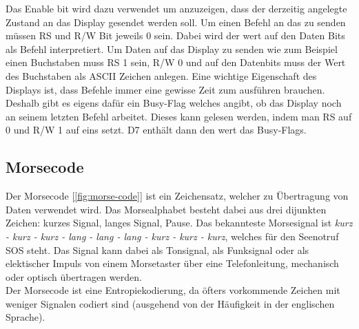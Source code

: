\documentclass[a4paper,12pt]{article}
\begin{document}
	Das Enable bit wird dazu verwendet um anzuzeigen, dass der derzeitig angelegte Zustand an das Display gesendet werden soll. Um einen Befehl an das zu senden müssen RS und R/W Bit jeweils 0 sein. Dabei wird der wert auf den Daten Bits als Befehl interpretiert. Um Daten auf das Display zu senden wie zum Beispiel einen Buchstaben muss RS 1 sein, R/W 0 und auf den Datenbits muss der Wert des Buchstaben als ASCII Zeichen anlegen. Eine wichtige Eigenschaft des Displays ist, dass Befehle immer eine gewisse Zeit zum ausführen brauchen. Deshalb gibt es eigens dafür ein Busy-Flag welches angibt, ob das Display noch an seinem letzten Befehl arbeitet. Dieses kann gelesen werden, indem man RS auf 0 und R/W 1 auf eins setzt. D7 enthält dann den wert das Busy-Flags.

	\subsection{Morsecode}
	Der Morsecode [\ref{fig:morse-code}] ist ein Zeichensatz, welcher zu Übertragung von Daten verwendet wird. Das Morsealphabet besteht dabei aus drei dijunkten Zeichen: kurzes Signal, langes Signal, Pause. Das bekannteste Morsesignal ist \textit{kurz - kurz - kurz - lang - lang - lang - kurz - kurz - kurz}, welches für den Seenotruf SOS steht. Das Signal kann dabei als Tonsignal, als Funksignal oder als elektischer Impuls von einem Morsetaster über eine Telefonleitung, mechanisch oder optisch übertragen werden.\\
	Der Morsecode ist eine Entropiekodierung, da öfters vorkommende Zeichen mit weniger Signalen codiert sind (ausgehend von der Häufigkeit in der englischen Sprache).\\
\end{document}
